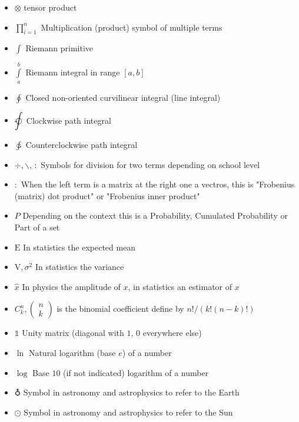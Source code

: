 \documentclass[12pt,a4paper,twoside,openright]{report}
\newcounter{def}
\theoremstyle{definition}
\theoremstyle{itexmp}
\numberwithin{equation}{section}
\begin{document}
\begin{itemize}[label={},leftmargin=0.5cm]
	 	\item $\otimes$ tensor product
	 	\item $\displaystyle \prod_{i=1}^n$ Multiplication (product) symbol of multiple terms
	 	\item $\displaystyle\int$ Riemann primitive
	 	\item $\displaystyle\int\limits_a^b$ Riemann integral in range $[a,b]$
	 	\item $\displaystyle\oint$ Closed non-oriented curvilinear integral (line integral)
	 	\item $\displaystyle\ointclockwise$ Clockwise path integral
	 	\item $\displaystyle\ointctrclockwise$ Counterclockwise path integral
	 	\item $\div, \backslash$, $:$ Symbols for division for two terms depending on school level
	 	\item $:$ When the left term is a matrix at the right one a vectros, this is "Frobenius (matrix) dot product" or "Frobenius inner product"
	 	\item $P$ Depending on the context this is a Probability, Cumulated Probability or Part of a set
	 	\item $\text{E}$ In statistics the expected mean
	 	\item $\text{V},\sigma^2$ In statistics the variance
	 	\item $\hat{x}$ In physics the amplitude of $x$, in statistics an estimator of $x$
	 	\item $C_k^n,\begin{pmatrix}n\\k\end{pmatrix}$ is the binomial coefficient define by $n!/(k!(n-k)!)$
	 	\item $\mathds{1}$ Unity matrix (diagonal with $1$, $0$ everywhere else)
	 	\item $\ln$ Natural logarithm (base $e$) of a number
	 	\item $\log$ Base $10$ (if not indicated) logarithm of a number
	 	\item $\earth$ Symbol in astronomy and astrophysics to refer to the Earth
	 	\item $\odot$ Symbol in astronomy and astrophysics to refer to the Sun
	\end{itemize}


\end{document}
